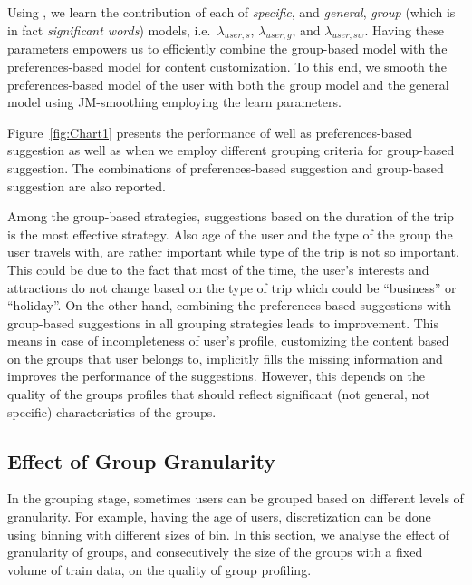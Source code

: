 Using \acswlm, we learn the contribution of each of \emph{specific}, and \emph{general}, \emph{group} (which is in fact \emph{significant words}) models, i.e.\ $\lambda_{user,s}$, $\lambda_{user,g}$, and $\lambda_{user,sw}$. Having these parameters empowers us to efficiently combine the group-based model with the preferences-based model for content customization. To this end, we smooth the preferences-based model of the user with both the group model and the general model using JM-smoothing \citep{Zhai:2001} employing the learn parameters.


Figure~\ref{fig:Chart1} presents the performance of well as preferences\:-\:based suggestion as well as when we employ different grouping criteria for group-\:based suggestion. The combinations of preferences\:-\:based suggestion and group-\:based suggestion are also reported. 

Among the group-based strategies, suggestions based on the duration of the trip is the most effective strategy. Also age of the user and the type of the group the user travels with, are rather important while type of the trip is not so important. This could be due to the fact that most of the time, the user's interests and attractions do not change based on the type of trip which could be ``business'' or ``holiday''. 
On the other hand, combining the preferences-based suggestions with group-based suggestions in all grouping strategies leads to improvement. This means in case of incompleteness of user's profile, customizing the content based on the groups that user belongs to, implicitly fills the missing information and improves the performance of the suggestions. However, this depends on the quality of the groups profiles that should reflect significant (not general, not specific) characteristics of the groups.

\subsection{Effect of Group Granularity}
\label{sec:gg}
In the grouping stage, sometimes users can be grouped based on different levels of granularity. For example, having the age of users, discretization can be done using binning with different sizes of bin. In this section, we analyse the effect of granularity of groups, and consecutively the size of the groups with a fixed volume of train data, on the quality of group profiling.

